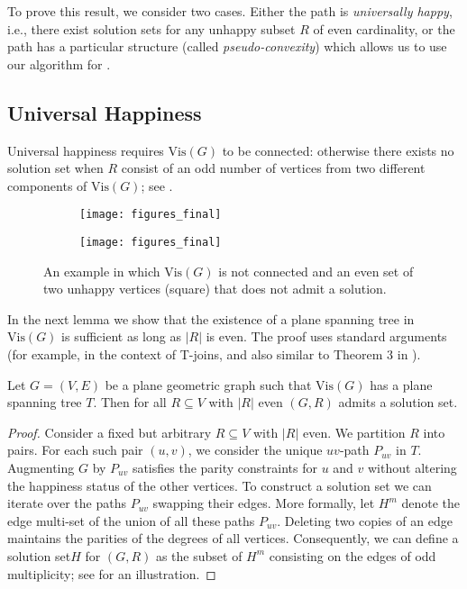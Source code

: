 \documentclass[a4paper,runningheads,cleveref,thm-restate]{lipics-v2021}
\newcommand{\Vis}[1]{\ensuremath{\mathrm{Vis}(#1)}}
\newcommand{\hset}{solution set\xspace}
\newcommand{\pseudoconvex}{pseudo-convex\xspace}
\begin{document}
To prove this result, we consider two cases. 
Either the path is \emph{universally happy}, i.e., there exist \hset{s} for any unhappy subset $R$ of even cardinality, or the path has a particular structure (called \emph{\pseudoconvex{ity}}) which allows us to use our algorithm for . 


\subsection{Universal Happiness}

Universal happiness requires \Vis{G} to be connected: 
otherwise there exists no \hset when $R$ consist of an odd number of vertices from two different components of \Vis{G}; see . 


\begin{figure}[htb]
	\centering
	\begin{subfigure}{.45\textwidth}
		\centering
		\texttt{[image: figures\_final]}
		\caption{}
		\label{fig:zigzagA}
	\end{subfigure}
	\hfil
	\begin{subfigure}{.45\textwidth}
		\centering
		\texttt{[image: figures\_final]}
		\caption{}
		\label{fig:zigzagB}
	\end{subfigure}
	\hfil
	
	\caption{An example in which \Vis{G} is not connected and an even set of two unhappy vertices (square) that does not admit a solution.}
	\label{fig:zigzag}
\end{figure}

In the next lemma we show that the existence of a plane spanning tree in \Vis{G} is sufficient as long as $|R|$ is even. 
The proof uses standard arguments (for example, in the context of T-joins, and also similar to Theorem 3 in \cite{maxcut}).

\begin{lemma}
\label{lem:Sufficient1}
	Let $G=(V,E)$ be a plane geometric graph such that \Vis{G} has a plane spanning tree $T$. 
	Then for all $R\subseteq V$ with $|R|$ even $(G,R)$ admits a \hset.
\end{lemma}

\begin{proof}
	Consider a fixed but arbitrary $R\subseteq V$ with $|R|$ even. 
	We partition $R$ into pairs. 
	For each such pair $(u,v)$, we consider the unique $uv$-path $P_{uv}$ in $T$. 
	Augmenting $G$ by $P_{uv}$ satisfies the parity constraints for $u$ and $v$ without altering the happiness status of the other vertices.  
	To construct a \hset we can iterate over the paths $P_{uv}$ swapping their edges. 
	More formally, 
	let $H^m$ denote the edge multi-set of the union of all these paths $P_{uv}$. 
	Deleting two copies of an edge maintains the parities of the degrees of all vertices. 
	Consequently, we can define a \hset $H$ for $(G,R)$ as the subset of $H^m$ consisting on the edges of odd multiplicity; see  for an illustration.
\end{proof}
\end{document}
